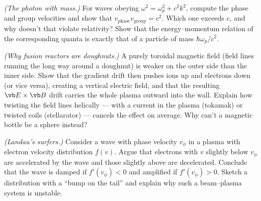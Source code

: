 \begin{problems}
\core \emph{(The photon with mass.)} For waves obeying $\omega^2 = \omega_p^2+c^2k^2$, compute the phase and group velocities and show that $v_{\text{phase}}v_{\text{group}} = c^2$. Which one exceeds $c$, and why doesn't that violate relativity? Show that the energy--momentum relation of the corresponding quanta is exactly that of a particle of mass $\hbar\omega_p/c^2$.

 \emph{(Why fusion reactors are doughnuts.)} A purely toroidal magnetic field (field lines running the long way around a doughnut) is weaker on the outer side than the inner side. Show that the gradient drift then pushes ions up and electrons down (or vice versa), creating a vertical electric field, and that the resulting $\vb E\times\vb B$ drift carries the whole plasma outward into the wall. Explain how twisting the field lines helically --- with a current in the plasma (tokamak) or twisted coils (stellarator) --- cancels the effect on average. Why can't a magnetic bottle be a sphere instead?

 \emph{(Landau's surfers.)} Consider a wave with phase velocity $v_\phi$ in a plasma with electron velocity distribution $f(v)$. Argue that electrons with $v$ slightly below $v_\phi$ are accelerated by the wave and those slightly above are decelerated. Conclude that the wave is damped if $f'(v_\phi)<0$ and amplified if $f'(v_\phi)>0$. Sketch a distribution with a ``bump on the tail'' and explain why such a beam--plasma system is unstable.
\end{problems}

\begin{reading}
\end{reading}

